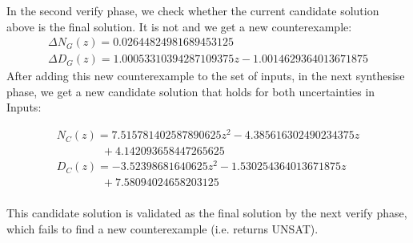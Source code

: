 \documentclass{sig-alternate-05-2015}
\newcommand{\blue}[1]{{\color{blue}#1}}
\begin{document}
In the second {\sc verify} phase, we check whether the current candidate
solution above is the final solution. It is not and we get a new counterexample:
$$
\begin{array}{ll}
\Delta N_G(z) = 0.02644824981689453125\\
\Delta D_G(z) {=} 1.00053310394287109375z{-}1.0014629364013671875
\end{array}
$$
After adding this new counterexample to the set of {\sc inputs}, in the 
next {\sc synthesise} phase, we get a new candidate solution that holds
for both uncertainties in {\sc Inputs}:

$$
\begin{array}{ll}
N_C(z) {=} 7.515781402587890625z^2{-}4.385616302490234375z\\
\qquad\qquad +4.142093658447265625\\
D_C(z) {=} -3.52398681640625z^2{-}1.530254364013671875z \\
\qquad\qquad +7.58094024658203125\\
\end{array}
$$

This candidate solution is validated as the final solution by the next 
{\sc verify} phase, which fails to find a new counterexample (i.e. returns UNSAT).



\end{document}
